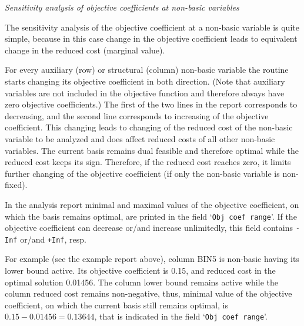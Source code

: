 \noindent
{\it Sensitivity analysis of objective coefficients at non-basic
variables}

The sensitivity analysis of the objective coefficient at a non-basic
variable is quite simple, because in this case change in the objective
coefficient leads to equivalent change in the reduced cost (marginal
value).

For every auxiliary (row) or structural (column) non-basic variable the
routine starts changing its objective coefficient in both direction.
(Note that auxiliary variables are not included in the objective
function and therefore always have zero objective coefficients.) The
first of the two lines in the report corresponds to decreasing, and the
second line corresponds to increasing of the objective coefficient.
This changing leads to changing of the reduced cost of the non-basic
variable to be analyzed and does affect reduced costs of all other
non-basic variables. The current basis remains dual feasible and
therefore optimal while the reduced cost keeps its sign. Therefore, if
the reduced cost reaches zero, it limits further changing of the
objective coefficient (if only the non-basic variable is non-fixed).

In the analysis report minimal and maximal values of the objective
coefficient, on which the basis remains optimal, are printed in the
field `\verb|Obj coef range|'. If the objective coefficient can
decrease or/and increase unlimitedly, this field contains {\tt -Inf}
or/and {\tt +Inf}, resp.

For example (see the example report above), column BIN5 is non-basic
having its lower bound active. Its objective coefficient is 0.15, and
reduced cost in the optimal solution 0.01456. The column lower bound
remains active while the column reduced cost remains non-negative,
thus, minimal value of the objective coefficient, on which the current
basis still remains optimal, is $0.15-0.01456=0.13644$, that is
indicated in the field `\verb|Obj coef range|'.

\newpage

